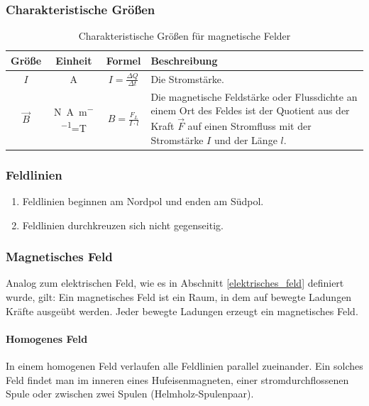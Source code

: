 \documentclass[a4paper]{article}
\begin{document}
			\subsubsection{Charakteristische Größen}
			\begin{table}[H]
				\def\arraystretch{1.5}
				\begin{tabularx}{\textwidth}{|c|c|c|X|}\hline
					Größe & Einheit & Formel & Beschreibung \\\hline
					$I$ & \si{\ampere} & $I=\frac{\Delta Q}{\Delta t}$ & Die Stromstärke.\\\hline
					$\vec{B}$ & \si{\newton\per\ampere\per\meter}=\si{\tesla} & $B=\frac{F_L}{I\cdot l}$ & Die magnetische Feldstärke oder Flussdichte an einem Ort des Feldes ist der Quotient aus der Kraft $\vec{F}$ auf einen Stromfluss mit der Stromstärke $I$ und der Länge $l$.\\\hline
				\end{tabularx}
				\caption {Charakteristische Größen für magnetische Felder}
				\label{table:magnetische_felder_grossen}
			\end{table}
		
			\subsubsection{Feldlinien}
				\begin{enumerate}
					\item Feldlinien beginnen am Nordpol und enden am Südpol.
					\item Feldlinien durchkreuzen sich nicht gegenseitig.
				\end{enumerate}
			
			\subsubsection{Magnetisches Feld}
				Analog zum elektrischen Feld, wie es in Abschnitt \ref{elektrisches_feld} definiert wurde, gilt: Ein magnetisches Feld ist ein Raum, in dem auf bewegte Ladungen Kräfte ausgeübt werden. Jeder bewegte Ladungen erzeugt ein magnetisches Feld.
				
				\paragraph{Homogenes Feld}
					In einem homogenen Feld verlaufen alle Feldlinien parallel zueinander. Ein solches Feld findet man im inneren eines Hufeisenmagneten, einer stromdurchflossenen Spule oder zwischen zwei Spulen (Helmholz-Spulenpaar).
					
\end{document}
